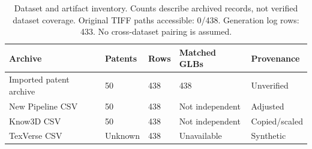 \begin{table}[t]
\centering\small
\caption{Dataset and artifact inventory. Counts describe archived records, not verified dataset coverage. Original TIFF paths accessible: 0/438. Generation log rows: 433. No cross-dataset pairing is assumed.}
\begin{tabular}{lllll}
\toprule
Archive & Patents & Rows & Matched GLBs & Provenance \\
\midrule
Imported patent archive & 50 & 438 & 438 & Unverified \\
New Pipeline CSV & 50 & 438 & Not independent & Adjusted \\
Know3D CSV & 50 & 438 & Not independent & Copied/scaled \\
TexVerse CSV & Unknown & 438 & Unavailable & Synthetic \\
\bottomrule
\end{tabular}
\end{table}

